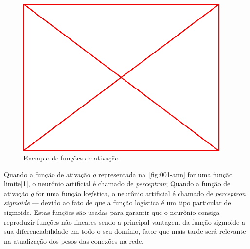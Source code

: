 \begin{figure}
\label{fig:002-limit-functions}
  \caption{Exemplo de funções de ativação}
  \begin{center}
    \includegraphics[height=8cm]{placeholder}
  \end{center}
\end{figure}

Quando a função de ativação $g$ representada na~\ref{fig:001-ann} for uma
função limite[\ref{fig:002-limit-functions}], o neurônio artificial é chamado
de \emph{perceptron}; Quando a função de ativação $g$ for uma função logística,
o neurônio artificial é chamado de \emph{perceptron sigmoide} --- devido ao
fato de que a função logística é um tipo particular de sigmoide. Estas funções
são usadas para garantir que o neurônio consiga reproduzir funções não lineares
sendo a principal vantagem da função sigmoide a sua diferenciabilidade em todo
o seu domínio, fator que mais tarde será relevante na atualização dos pesos das
conexões na rede.
